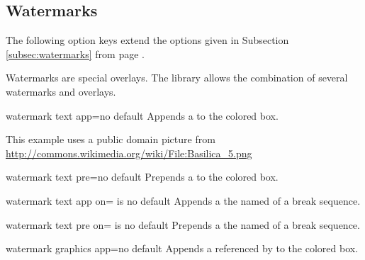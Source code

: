 \clearpage
\subsection{Watermarks}
The following option keys extend the options given in Subsection \ref{subsec:watermarks}
from page \pageref{subsec:watermarks}.

\begin{marker}
Watermarks are special overlays. The  library allows the combination
of several watermarks and overlays.
\end{marker}

\begin{docTcbKey}{watermark text app}{=}{no default}
  Appends a  to the colored box.
\begin{dispExample}

\begin{tcolorbox}[enhanced,title=My title,watermark graphics=Basilica_5.png,
  watermark opacity=0.25,
  watermark text app=Basilica,watermark color=Navy
  ]
\lipsum[1-2]
\tcblower
This example uses a public domain picture from\\
\url{http://commons.wikimedia.org/wiki/File:Basilica_5.png}
\end{tcolorbox}
\end{dispExample}
\end{docTcbKey}

\begin{docTcbKey}{watermark text pre}{=}{no default}
  Prepends a  to the colored box.
\end{docTcbKey}

\begin{docTcbKey}{watermark text app on}{= is }{no default}
  Appends a  the named  of a break sequence.
\end{docTcbKey}

\begin{docTcbKey}{watermark text pre on}{= is }{no default}
  Prepends a  the named  of a break sequence.
\end{docTcbKey}

\clearpage
\begin{docTcbKey}{watermark graphics app}{=}{no default}
  Appends a  referenced by  to the colored box.
\end{docTcbKey}

